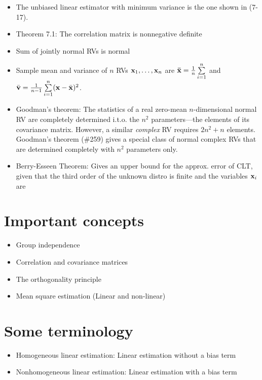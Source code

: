 \documentclass[a4paper, oneside]{book}
\begin{document}
\begin{itemize}
\item The unbiased linear estimator with minimum variance is the one shown in (7-17).
\item Theorem 7.1: The correlation matrix is nonnegative definite
\item Sum of jointly normal RVs is normal
\item Sample mean and variance of $n$ RVs $\mathbf{x}_1, \hdots, \mathbf{x}_n$ are $\mathbf{\bar{x}} = \frac{1}{n}\sum\limits_{i=1}^n$ and $\bar{\mathbf{v}} = \frac{1}{n-1}\sum\limits_{i=1}^n(\mathbf{x}-\bar{\mathbf{x}})^2$.
\item Goodman's theorem: The statistics of a real zero-mean $n$-dimensional normal RV are completely determined i.t.o. the $n^2$ parameters\----the elements of its covariance matrix. However, a similar \textit{complex} RV requires $2n^2+n$ elements. Goodman's theorem (\#259) gives a special class of normal complex RVs that are determined completely with $n^2$ parameters only.
\item Berry-Esseen Theorem: Gives an upper bound for the approx. error of CLT, given that the third order of the unknown distro is finite and the variables $\mathbf{x}_i$ are \iid
\end{itemize}

\section{Important concepts}

\begin{itemize}
\item Group independence
\item Correlation and covariance matrices
\item The orthogonality principle
\item Mean square estimation (Linear and non-linear)
\end{itemize}

\section{Some terminology}
\begin{itemize}
\item Homogeneous linear estimation:  Linear estimation without a bias term
\item Nonhomogeneous linear estimation: Linear estimation with a bias term

\end{itemize}
\end{document}
